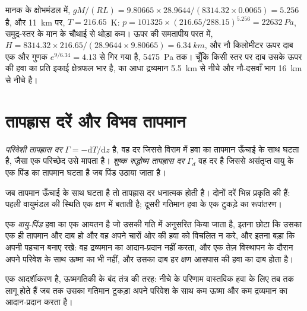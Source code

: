 मानक के क्षोभमंडल में, $gM/(RL) = 9.80665 \times 28.9644 /
(8314.32 \times 0.0065) = 5.256$ है, और \qty{11}{km} पर, $T = 216.65$~K: $p = \num{101325} \times (216.65/288.15)^{5.256} = \qty{22632}{Pa}$, समुद्र-स्तर के मान के चौथाई से थोड़ा कम। ऊपर की समतापीय परत में, $H =
8314.32 \times 216.65/(28.9644 \times 9.80665) = \qty{6.34}{km}$, और नौ किलोमीटर ऊपर दाब एक और गुणक $e^{9/6.34} =
4.13$ से गिर गया है, \qty{5475}{Pa} तक। चूँकि किसी स्तर पर दाब उसके ऊपर की हवा का प्रति इकाई क्षेत्रफल भार है,  का आधा द्रव्यमान \qty{5.5}{km} से नीचे और नौ-दसवाँ भाग \qty{16}{km} से नीचे है।

\section{तापह्रास दरें और विभव तापमान}\label{sec:b1:fluid-envelopes-structure:lapse}

\begin{definition}[परिवेशी और शुष्क रुद्धोष्म तापह्रास दरें]\label{def:b1:fluid-envelopes-structure:lapse-rate}
\emph{परिवेशी तापह्रास दर} $\Gamma =
-\mathrm dT/\mathrm dz$ है, वह दर जिससे विराम में हवा का तापमान ऊँचाई के साथ घटता है, जैसा एक परिच्छेद उसे मापता है। \emph{शुष्क रुद्धोष्म तापह्रास दर} $\Gamma_d$ वह दर है जिससे असंतृप्त वायु के एक पिंड का तापमान घटता है जब पिंड उठाया जाता है।
\end{definition}

जब तापमान ऊँचाई के साथ घटता है तो तापह्रास दर धनात्मक होती है। दोनों दरें भिन्न प्रकृति की हैं: पहली वायुमंडल की स्थिति एक क्षण में बताती है; दूसरी गतिमान हवा के एक टुकड़े का रूपांतरण।

\begin{definition}[वायु-पिंड]\label{def:b1:fluid-envelopes-structure:parcel}
एक \emph{वायु-पिंड} हवा का एक आयतन है जो उसकी गति में अनुसरित किया जाता है, इतना छोटा कि उसका एक ही तापमान और दाब हो और वह अपने चारों ओर की हवा को विचलित न करे, और इतना बड़ा कि अपनी पहचान बनाए रखे: वह द्रव्यमान का आदान-प्रदान नहीं करता, और एक तेज़ विस्थापन के दौरान अपने परिवेश के साथ ऊष्मा का भी नहीं, और उसका दाब हर क्षण आसपास की हवा का दाब होता है।
\end{definition}

 एक आदर्शीकरण है, ऊष्मगतिकी के बंद तंत्र की तरह: नीचे के परिणाम वास्तविक हवा के लिए तब तक लागू होते हैं जब तक उसका गतिमान टुकड़ा अपने परिवेश के साथ कम ऊष्मा और कम द्रव्यमान का आदान-प्रदान करता है।

